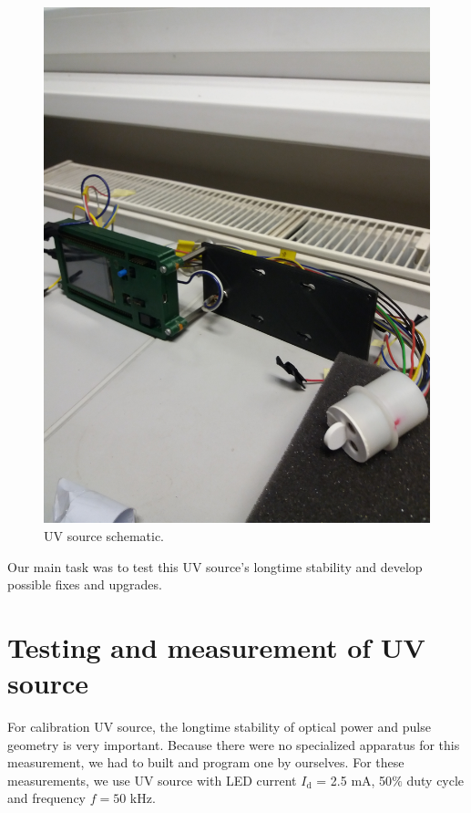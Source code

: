  \begin{figure}[H]
 \centering
 \includegraphics[scale=0.09, angle = 270, origin = c]{./pictures/KarlsRuhe}
 \caption{UV source schematic.}
 \label{UVsource}
\end{figure}


Our main task was to test this UV source's longtime stability and develop possible fixes and upgrades.


\section{Testing and measurement of UV source}
For calibration UV source, the longtime stability of optical power and pulse geometry is very important. Because there were no specialized apparatus for this measurement, we had to built and program one by ourselves. For these measurements, we use UV source with LED current $I_{\textrm{d}}$ = 2.5 mA, 50$\%$ duty cycle and frequency $f = 50$ kHz. 

